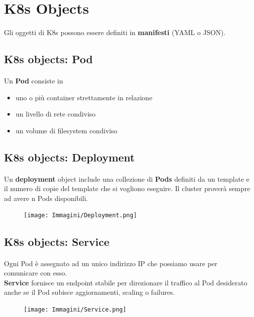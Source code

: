 \documentclass[a4paper, 12pt]{report}
\begin{document}
          \section{K8s Objects}
          \paragraph{}Gli oggetti di K8s possono essere definiti in \textbf{manifesti} (YAML o JSON).
          \subsection{K8s objects: Pod}
          \paragraph{}Un \textbf{Pod} consiste in 
            \begin{itemize}
              \item uno o più container strettamente in relazione
              \item un livello di rete condiviso
              \item un volume di filesystem condiviso
            \end{itemize}
          \subsection{K8s objects: Deployment}
          \paragraph{}Un \textbf{deployment} object include una collezione di \textbf{Pods} definiti da un template e il numero di copie del template che si vogliono eseguire.
          Il cluster proverà sempre ad avere n Pods disponibili.
          \begin{figure}[h]
            \centering
            \texttt{[image: Immagini/Deployment.png]}
          \end{figure}
          \clearpage
          \subsection{K8s objects: Service}
          \paragraph{}Ogni Pod è assegnato ad un unico indirizzo IP che possiamo usare per comunicare con esso.\\
          \textbf{Service} fornisce un endpoint stabile per direzionare il traffico al Pod desiderato anche se il Pod subisce aggiornamenti, scaling o failures.
          \begin{figure}[h]
            \centering
            \texttt{[image: Immagini/Service.png]}
          \end{figure}
\end{document}
